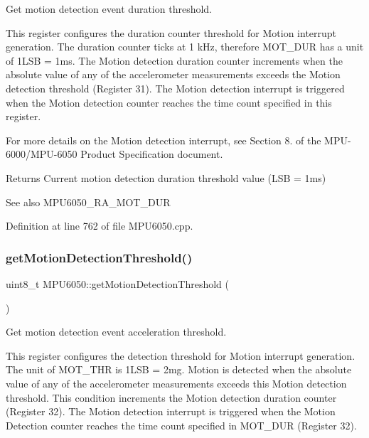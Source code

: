 Get motion detection event duration threshold. 

This register configures the duration counter threshold for Motion interrupt generation. The duration counter ticks at 1 k\+Hz, therefore M\+O\+T\+\_\+\+D\+UR has a unit of 1L\+SB = 1ms. The Motion detection duration counter increments when the absolute value of any of the accelerometer measurements exceeds the Motion detection threshold (Register 31). The Motion detection interrupt is triggered when the Motion detection counter reaches the time count specified in this register.

For more details on the Motion detection interrupt, see Section 8. of the M\+P\+U-\/6000/\+M\+P\+U-\/6050 Product Specification document.

\begin{DoxyReturn}{Returns}
Current motion detection duration threshold value (L\+SB = 1ms) 
\end{DoxyReturn}
\begin{DoxySeeAlso}{See also}
M\+P\+U6050\+\_\+\+R\+A\+\_\+\+M\+O\+T\+\_\+\+D\+UR 
\end{DoxySeeAlso}


Definition at line 762 of file M\+P\+U6050.\+cpp.

\mbox{\label{classMPU6050_ab7a825b1b8b86cebda308289630795e7}} 
\subsubsection{\texorpdfstring{getMotionDetectionThreshold()}{getMotionDetectionThreshold()}}
{\footnotesize\ttfamily uint8\+\_\+t M\+P\+U6050\+::get\+Motion\+Detection\+Threshold (\begin{DoxyParamCaption}{ }\end{DoxyParamCaption})}



Get motion detection event acceleration threshold. 

This register configures the detection threshold for Motion interrupt generation. The unit of M\+O\+T\+\_\+\+T\+HR is 1L\+SB = 2mg. Motion is detected when the absolute value of any of the accelerometer measurements exceeds this Motion detection threshold. This condition increments the Motion detection duration counter (Register 32). The Motion detection interrupt is triggered when the Motion Detection counter reaches the time count specified in M\+O\+T\+\_\+\+D\+UR (Register 32).

